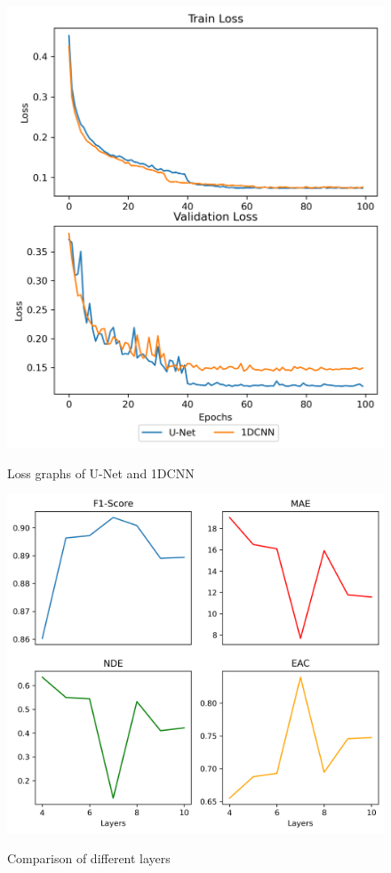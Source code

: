 \documentclass[sigconf]{acmart}
\begin{document}
\begin{figure}
  \caption{Loss graphs of U-Net and 1DCNN}
  \includegraphics[scale=0.6]{figures/loss_graphs.png}
  \label{fig:loss_graphs}
\end{figure}

\begin{figure}
  \caption{Comparison of different layers}
  \includegraphics[scale=0.5]{figures/layer_comp.png}
  \label{fig:layer_comp}
\end{figure}
\end{document}
